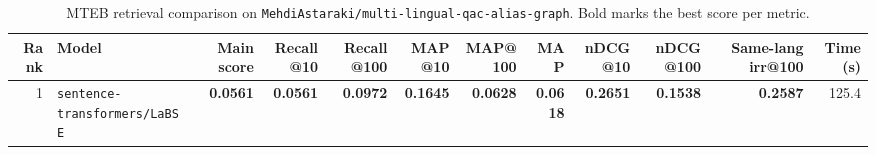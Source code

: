 \begin{table}[t]
\centering
\small
\begin{tabular}{r l r r r r r r r r r r}
\hline
Rank & Model & Main score & Recall@10 & Recall@100 & MAP@10 & MAP@100 & MAP & nDCG@10 & nDCG@100 & Same-lang irr@100 & Time (s) \\
\hline
1 & \texttt{sentence-transformers/LaBSE} & \textbf{0.0561} & \textbf{0.0561} & \textbf{0.0972} & \textbf{0.1645} & \textbf{0.0628} & \textbf{0.0618} & \textbf{0.2651} & \textbf{0.1538} & \textbf{0.2587} & 125.4 \\
\hline
\end{tabular}
\caption{MTEB retrieval comparison on \texttt{MehdiAstaraki/multi-lingual-qac-alias-graph}. Bold marks the best score per metric.}
\label{tab:mteb-model-comparison}
\end{table}
